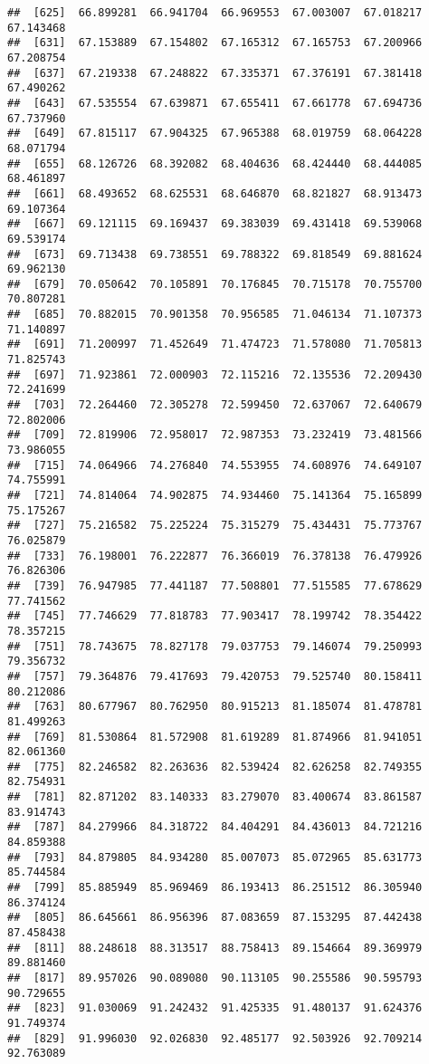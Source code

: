 \documentclass[]{article}
\begin{document}
\begin{verbatim}
##  [625]  66.899281  66.941704  66.969553  67.003007  67.018217  67.143468
##  [631]  67.153889  67.154802  67.165312  67.165753  67.200966  67.208754
##  [637]  67.219338  67.248822  67.335371  67.376191  67.381418  67.490262
##  [643]  67.535554  67.639871  67.655411  67.661778  67.694736  67.737960
##  [649]  67.815117  67.904325  67.965388  68.019759  68.064228  68.071794
##  [655]  68.126726  68.392082  68.404636  68.424440  68.444085  68.461897
##  [661]  68.493652  68.625531  68.646870  68.821827  68.913473  69.107364
##  [667]  69.121115  69.169437  69.383039  69.431418  69.539068  69.539174
##  [673]  69.713438  69.738551  69.788322  69.818549  69.881624  69.962130
##  [679]  70.050642  70.105891  70.176845  70.715178  70.755700  70.807281
##  [685]  70.882015  70.901358  70.956585  71.046134  71.107373  71.140897
##  [691]  71.200997  71.452649  71.474723  71.578080  71.705813  71.825743
##  [697]  71.923861  72.000903  72.115216  72.135536  72.209430  72.241699
##  [703]  72.264460  72.305278  72.599450  72.637067  72.640679  72.802006
##  [709]  72.819906  72.958017  72.987353  73.232419  73.481566  73.986055
##  [715]  74.064966  74.276840  74.553955  74.608976  74.649107  74.755991
##  [721]  74.814064  74.902875  74.934460  75.141364  75.165899  75.175267
##  [727]  75.216582  75.225224  75.315279  75.434431  75.773767  76.025879
##  [733]  76.198001  76.222877  76.366019  76.378138  76.479926  76.826306
##  [739]  76.947985  77.441187  77.508801  77.515585  77.678629  77.741562
##  [745]  77.746629  77.818783  77.903417  78.199742  78.354422  78.357215
##  [751]  78.743675  78.827178  79.037753  79.146074  79.250993  79.356732
##  [757]  79.364876  79.417693  79.420753  79.525740  80.158411  80.212086
##  [763]  80.677967  80.762950  80.915213  81.185074  81.478781  81.499263
##  [769]  81.530864  81.572908  81.619289  81.874966  81.941051  82.061360
##  [775]  82.246582  82.263636  82.539424  82.626258  82.749355  82.754931
##  [781]  82.871202  83.140333  83.279070  83.400674  83.861587  83.914743
##  [787]  84.279966  84.318722  84.404291  84.436013  84.721216  84.859388
##  [793]  84.879805  84.934280  85.007073  85.072965  85.631773  85.744584
##  [799]  85.885949  85.969469  86.193413  86.251512  86.305940  86.374124
##  [805]  86.645661  86.956396  87.083659  87.153295  87.442438  87.458438
##  [811]  88.248618  88.313517  88.758413  89.154664  89.369979  89.881460
##  [817]  89.957026  90.089080  90.113105  90.255586  90.595793  90.729655
##  [823]  91.030069  91.242432  91.425335  91.480137  91.624376  91.749374
##  [829]  91.996030  92.026830  92.485177  92.503926  92.709214  92.763089

\end{verbatim}
\end{document}
